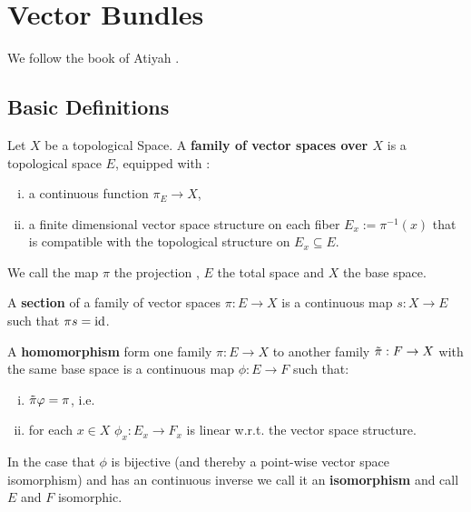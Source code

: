 \section{Vector Bundles}
We follow the book of Atiyah \cite{atiyah1989k}.
\subsection{Basic Definitions}
\begin{definition} \label{def: Familiy of vector spaces}
	Let $X$ be a topological Space. A \textbf{family of vector spaces over $X$} is a topological space $E$, equipped with :
	\begin{enumerate}[(i)]
		\item a continuous function $\pi_E \to X$,
		\item a finite dimensional vector space structure on each fiber ${E_x:=\pi^{-1}(x)}$ that is compatible with the topological structure on $E_x\subseteq E$.
	\end{enumerate}
	We call the map $\pi$ the projection , $E$ the total space and $X$ the base space.
\end{definition}
\begin{definition}[Section] \label{def: section}
	A \textbf{section} of a family of vector spaces $\pi:E\to X$ is a continuous map $s:X\to E$ such that $\pi s=\id$. 
\end{definition}
\begin{definition}\label{def: Homomorphism of families of vector spaces}
	A \textbf{homomorphism} form one family $\pi:E\to X$ to another family $\Tilde{\pi}:F \to X$ with the same base space is a continuous map $\phi: E\to F$ such that:
	\begin{enumerate}[(i)]
		\item $\Tilde{\pi}\phi=\pi$, i.e. 
		\item for each $x\in X$ $\phi_x:E_x\to F_x$ is linear w.r.t. the vector space structure. 
	\end{enumerate} In the case that $\phi$ is bijective (and thereby a point-wise vector space isomorphism) and has an continuous inverse we call it an \textbf{isomorphism} and call $E$ and $F$ isomorphic. 
\end{definition}
